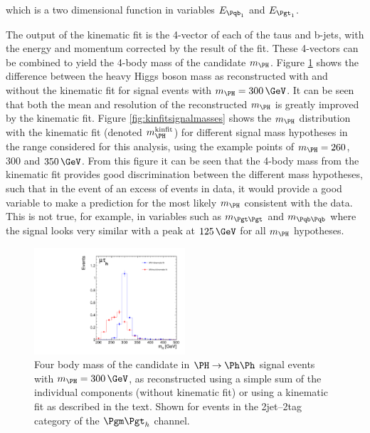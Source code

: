 which is a two dimensional function in variables $E_{\Pqb_{1}}$ and $E_{\Pgt_{1}}$.

The output of the kinematic fit is the 4-vector of each of the taus and b-jets,
with the energy and momentum corrected by the result of the fit. These 4-vectors
can be combined to yield the 4-body mass of the candidate $m_{\PH}$. Figure
\ref{fig:kinfitvsmttbb}
shows the difference between the heavy Higgs boson mass as reconstructed with and
without the kinematic fit for signal events with $m_{\PH}=300\,\GeV$. It can
be seen that both the mean and resolution of the reconstructed $m_{\PH}$ 
is greatly improved by the kinematic fit. Figure \ref{fig:kinfitsignalmasses} shows the
$m_{\PH}$ distribution with the kinematic fit (denoted $m_{\PH}^{\text{kinfit}}$) 
for different signal mass hypotheses in the range
considered for this analysis, using the example points of $m_{\PH}=260$, $300$ 
and $350\,\GeV$. From this figure it can be seen that the 4-body mass from the kinematic fit provides
good discrimination between the different mass hypotheses, such that in the
event of an excess of events in data, it would provide a good variable to make a prediction for
the most likely $m_{\PH}$ consistent with the data. This is not true, for example, 
in variables such as $m_{\Pgt\Pgt}$ and $m_{\Pqb\Pqb}$ where the signal looks very 
similar with a peak at $125\,\GeV$ for all $m_{\PH}$ hypotheses.

\begin{figure}
\begin{center}
    \includegraphics[width=0.5\textwidth]
      {plots/Hhh/m_H_kinfit_vs_mttbb_2jet2tagSFMassCuts_mt_ggHTohh300.pdf}

\end{center}
\caption[Four body mass of the candidate \PH in $\PH\to\Ph\Ph$ signal events with
$m_{\PH}=300\,\GeV$, reconstructed with or without a kinematic fit.]{
Four body mass of the candidate \PH in $\PH\to\Ph\Ph$ signal events with
$m_{\PH}=300\,\GeV$, as reconstructed using a simple sum of the
individual components (without kinematic fit) or using a kinematic fit as
described in the text. Shown for events in the 2jet--2tag category of the
$\mutau$ channel.}
\label{fig:kinfitvsmttbb}
\end{figure} 

